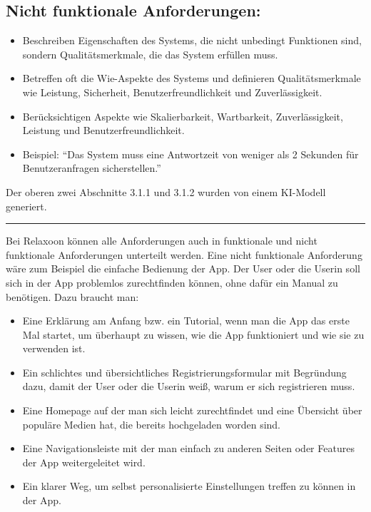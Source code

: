 \subsection{Nicht funktionale Anforderungen:}
\begin{itemize}
  \item Beschreiben Eigenschaften des Systems, die nicht unbedingt Funktionen sind, sondern Qualitätsmerkmale, die das System erfüllen muss.
  \item Betreffen oft die Wie-Aspekte des Systems und definieren Qualitätsmerkmale wie Leistung, Sicherheit, Benutzerfreundlichkeit und Zuverlässigkeit.
  \item Berücksichtigen Aspekte wie Skalierbarkeit, Wartbarkeit, Zuverlässigkeit, Leistung und Benutzerfreundlichkeit.
  \item Beispiel: "`Das System muss eine Antwortzeit von weniger als 2 Sekunden für Benutzeranfragen sicherstellen."'
\end{itemize}

Der oberen zwei Abschnitte 3.1.1 und 3.1.2 wurden von einem KI-Modell generiert.\cite{chatgpt}

\rule{\linewidth}{0.5pt}

Bei Relaxoon können alle Anforderungen auch in funktionale und nicht funktionale Anforderungen unterteilt werden.
Eine nicht funktionale Anforderung wäre zum Beispiel die einfache Bedienung der App. Der User oder die Userin
soll sich in der App problemlos zurechtfinden können, ohne dafür ein Manual zu benötigen. Dazu braucht man:
\begin{itemize}
      \item  Eine Erklärung am Anfang bzw. ein Tutorial, wenn man die App das erste Mal startet, um überhaupt 
      zu wissen, wie die App funktioniert und wie sie zu verwenden ist.
      \item Ein schlichtes und übersichtliches Registrierungsformular mit Begründung dazu, damit der User oder
      die Userin weiß, warum er sich registrieren muss.
      \item Eine Homepage auf der man sich leicht zurechtfindet und eine Übersicht über populäre Medien hat, die
      bereits hochgeladen worden sind.
      \item Eine Navigationsleiste mit der man einfach zu anderen Seiten oder Features der App weitergeleitet wird.
      \item Ein klarer Weg, um selbst personalisierte Einstellungen treffen zu können in der App. 
\end{itemize}

